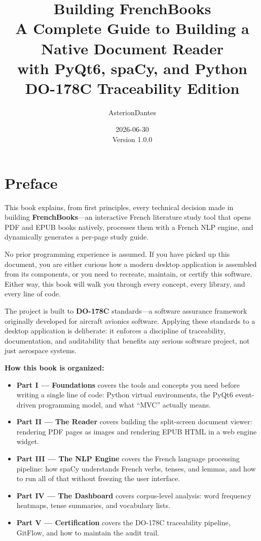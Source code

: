 \documentclass[12pt,oneside]{book}
\title{
  {\Huge \textbf{Building FrenchBooks}}\\[0.5em]
  {\large A Complete Guide to Building a Native Document Reader\\
  with PyQt6, spaCy, and Python}\\[1em]
  {\normalsize DO-178C Traceability Edition}
}
\author{AsterionDantes}
\date{2026-06-30 \\ Version 1.0.0}
\begin{document}

\maketitle
\thispagestyle{empty}
\newpage

\frontmatter

\tableofcontents
\newpage

\chapter*{Preface}

This book explains, from first principles, every technical decision made in building
\textbf{FrenchBooks}—an interactive French literature study tool that opens PDF and EPUB
books natively, processes them with a French NLP engine, and dynamically generates a
per-page study guide.

No prior programming experience is assumed. If you have picked up this document, you are
either curious how a modern desktop application is assembled from its components, or you
need to recreate, maintain, or certify this software. Either way, this book will walk you
through every concept, every library, and every line of code.

The project is built to \textbf{DO-178C} standards—a software assurance framework
originally developed for aircraft avionics software. Applying these standards to a desktop
application is deliberate: it enforces a discipline of traceability, documentation, and
auditability that benefits any serious software project, not just aerospace systems.

\textbf{How this book is organized:}

\begin{itemize}
  \item \textbf{Part I — Foundations} covers the tools and concepts you need before
    writing a single line of code: Python virtual environments, the PyQt6 event-driven
    programming model, and what ``MVC'' actually means.
  \item \textbf{Part II — The Reader} covers building the split-screen document viewer:
    rendering PDF pages as images and rendering EPUB HTML in a web engine widget.
  \item \textbf{Part III — The NLP Engine} covers the French language processing pipeline:
    how spaCy understands French verbs, tenses, and lemmas, and how to run all of that
    without freezing the user interface.
  \item \textbf{Part IV — The Dashboard} covers corpus-level analysis: word frequency
    heatmaps, tense summaries, and vocabulary lists.
  \item \textbf{Part V — Certification} covers the DO-178C traceability pipeline, GitFlow,
    and how to maintain the audit trail.
\end{itemize}
\end{document}

